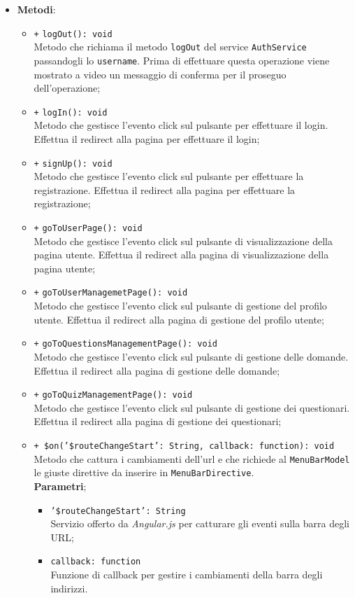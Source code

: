 \begin{itemize}
\begin{itemize}
	\end{itemize}
	\item \textbf{Metodi}: 
	\begin{itemize}
		\item \texttt{+} \texttt{logOut(): void} \\
		Metodo che richiama il metodo \texttt{logOut} del service \texttt{AuthService} passandogli lo \texttt{username}. Prima di effettuare questa operazione viene mostrato a video un messaggio di conferma per il proseguo dell'operazione; 
		\item \texttt{+} \texttt{logIn(): void} \\
		Metodo che gestisce l’evento click sul pulsante per effettuare il login. Effettua il redirect alla pagina per effettuare il login; 
		\item \texttt{+} \texttt{signUp(): void} \\
		Metodo che gestisce l’evento click sul pulsante per effettuare la registrazione. Effettua il redirect alla pagina per effettuare la registrazione; 
		\item \texttt{+} \texttt{goToUserPage(): void} \\
		Metodo che gestisce l’evento click sul pulsante di visualizzazione della pagina utente. Effettua il redirect alla pagina di visualizzazione della pagina utente; 
		\item \texttt{+} \texttt{goToUserManagemetPage(): void} \\
		Metodo che gestisce l’evento click sul pulsante di gestione del profilo utente. Effettua il redirect alla pagina di gestione del profilo utente; 
		\item \texttt{+} \texttt{goToQuestionsManagementPage(): void} \\
		Metodo che gestisce l’evento click sul pulsante di gestione delle domande. Effettua il redirect alla pagina di gestione delle domande; 
		\item \texttt{+} \texttt{goToQuizManagementPage(): void} \\
		Metodo che gestisce l’evento click sul pulsante di gestione dei questionari. Effettua il redirect alla pagina di gestione dei questionari;
		\item \texttt{+ \$on('\$routeChangeStart': String, callback: function): void} \\
		Metodo che cattura i cambiamenti dell'url e che richiede al \texttt{MenuBarModel} le giuste direttive da inserire in \texttt{MenuBarDirective}. \\
		\textbf{Parametri};
		\begin{itemize}
			\item \texttt{'\$routeChangeStart': String}	\\ Servizio offerto da \textit{Angular.js} per catturare gli eventi sulla barra degli URL;
			\item \texttt{callback: function}	\\ Funzione di callback per gestire i cambiamenti della barra degli indirizzi.
		\end{itemize}
	\end{itemize}
\end{itemize}

